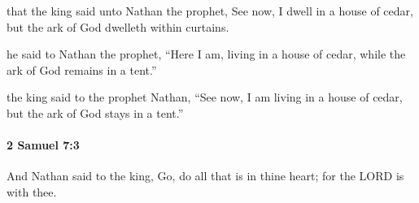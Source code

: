 			\begin{versebox}
					\item[BHS] 
					\item[ASV] that the king said unto Nathan the prophet, See now, I dwell in a house of cedar, but the ark of God dwelleth within curtains.
					\item[NIV] he said to Nathan the prophet, “Here I am, living in a house of cedar, while the ark of God remains in a tent.”
					\item[NRSV] the king said to the prophet Nathan, “See now, I am living in a house of cedar, but the ark of God stays in a tent.”
			\end{versebox}

		\paragraph{2 Samuel 7:3} %
			\label{2SAMUEL-7-3}

			And Nathan said to the king, Go, do all that is in thine heart; for the LORD is with thee.

